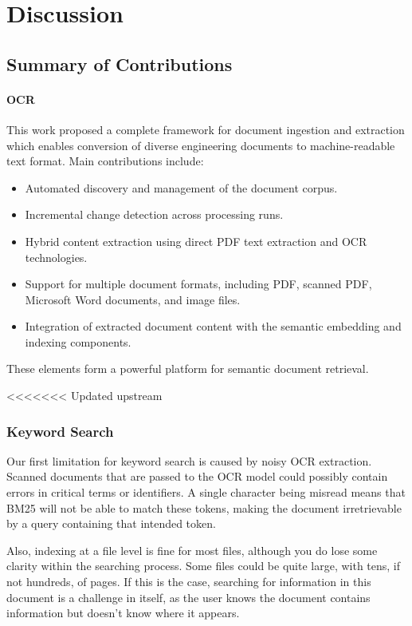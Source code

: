 \section{Discussion}
\label{sec:discussion}

\subsection{Summary of Contributions}
\paragraph{OCR}

This work proposed a complete framework for document ingestion and extraction which enables conversion of diverse engineering documents to machine-readable text format. 
Main contributions include:
\begin{itemize}
    \item Automated discovery and management of the document corpus.
    \item Incremental change detection across processing runs.
    \item Hybrid content extraction using direct PDF text extraction and OCR technologies.
    \item Support for multiple document formats, including PDF, scanned PDF, Microsoft Word documents, and image files.
    \item Integration of extracted document content with the semantic embedding and indexing components.
\end{itemize}

These elements form a powerful platform for semantic document retrieval.


<<<<<<< Updated upstream
\subsubsection{Keyword Search}
Our first limitation for keyword search is caused by noisy OCR extraction. Scanned documents that are passed to the OCR model could possibly contain errors in critical terms or identifiers. A single character being misread means that BM25 will not be able to match these tokens, making the document irretrievable by a query containing that intended token.

Also, indexing at a file level is fine for most files, although you do lose some clarity within the searching process. Some files could be quite large, with tens, if not hundreds, of pages. If this is the case, searching for information in this document is a challenge in itself, as the user knows the document contains information but doesn't know where it appears.

